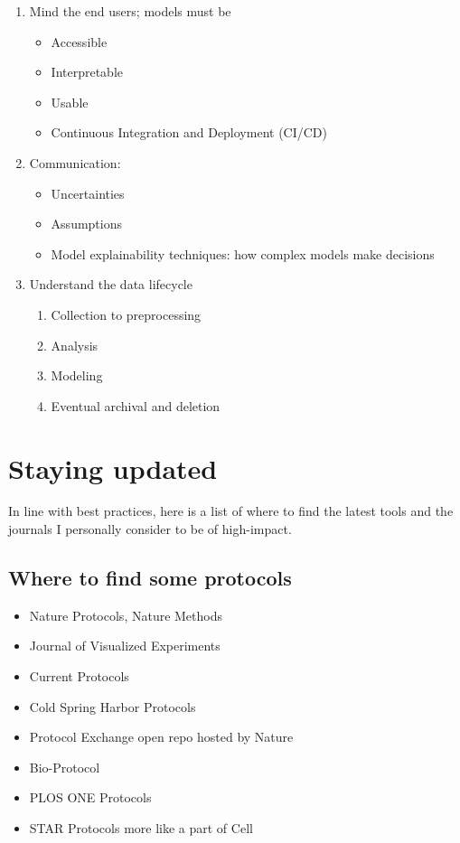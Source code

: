 \documentclass[11pt]{report}
\begin{document}
{\begin{enumerate}
\begin{itemize}
			\item Feedback from domain expertise
			\item Auditing 
		\end{itemize}
		\item Mind the end users; models must be 
		\begin{itemize}
			\item Accessible 
			\item Interpretable
			\item Usable 
			\item Continuous Integration and Deployment (CI/CD)
		\end{itemize}
		\item Communication:
		\begin{itemize}
			\item Uncertainties
			\item Assumptions
			\item Model explainability techniques: how complex models make decisions
			
		\end{itemize} 
	\item Understand the data lifecycle
		\begin{enumerate}
			\item Collection to preprocessing
			\item Analysis
			\item Modeling
			\item Eventual archival and deletion
		\end{enumerate}
	\end{enumerate}



\section{Staying updated}
In line with best practices, here is a list of where to find the latest tools and the journals I personally consider to be of high-impact. 
\subsection{Where to find some protocols}
\begin{itemize}
	\item Nature Protocols, Nature Methods
	\item Journal of Visualized Experiments
	\item Current Protocols
	\item Cold Spring Harbor Protocols
	\item Protocol Exchange \dotfill open repo hosted by Nature
	\item Bio-Protocol
	\item PLOS ONE Protocols
	\item STAR Protocols \dotfill more like a part of Cell
\end{itemize}

}
\end{document}
